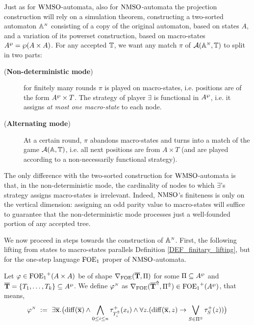 Just as for $\mathrm{WMSO}$-automata, also for $\mathrm{NMSO}$-automata the projection construction will rely on a simulation theorem, constructing a two-sorted automaton $\mathbb{A}^{{\scriptscriptstyle N}}$ consisting of a copy of the original automaton, based on states $A$, and a variation of its powerset construction, based on macro-states $A^{\wp} = \wp(A \times A)$. For any accepted $\mathbb{T}$, we want any match $\pi$ of $\mathcal{A}(\mathbb{A}^{{\scriptscriptstyle N}},\mathbb{T})$ to split in two parts:
\begin{description}
  \item[(\textbf{Non-deterministic mode})] for finitely many rounds $\pi$ is played on macro-states, i.e. positions are of the form $A^{\wp} \times T$. The strategy of player $\exists$ is functional in $A^{\wp}$, i.e. it assigns \emph{at most one macro-state} to each node.
  \item[(\textbf{Alternating mode})] At a certain round, $\pi$ abandons macro-states and turns into a match of the game $\mathcal{A}(\mathbb{A},\mathbb{T})$, i.e. all next positions are from $A \times T$ (and are played according to a non-necessarily functional strategy). %
\end{description}
The only difference with the two-sorted construction for $\mathrm{WMSO}$-automata is that, in the non-deterministic mode, the cardinality of nodes to which $\exists$'s strategy assigns macro-states is irrelevant. Indeed, $\mathrm{NMSO}$'s finiteness is only on the vertical dimension: assigning an odd parity value to macro-states will suffice to guarantee that the non-deterministic mode processes just a well-founded portion of any accepted tree.

We now proceed in steps towards the construction of $\mathbb{A}^{{\scriptscriptstyle N}}$. First, the following lifting from states to macro-states parallels Definition \ref{DEF_finitary_lifting}, but for the one-step language $\mathrm{FOE}_1$ proper of $\mathrm{NMSO}$-automata.

\begin{definition}\label{DEF_noetherian_lifting}
Let $\varphi \in {\ensuremath{\mathrm{FOE}_1}}^+(A \times A)$ be of shape $\nabla_{\mathrm{FOE}}(\overline{{\mathbf{T}}},\Pi)$ for some $\Pi \subseteq A^{\wp}$ and $\overline{{\mathbf{T}}} = \{T_1,\dots,T_k\} \subseteq A^{\wp}$. We define $\varphi^{{\scriptscriptstyle N}}$ as $\nabla_{\mathrm{FOE}}(\overline{{\mathbf{T}}}^{\Uparrow},\Pi^{\Uparrow}) \in {\ensuremath{\mathrm{FOE}_1}}^+(A^{\wp} )$, that means,
\begin{equation}\label{eq:unfoldingNablaofoe}
\varphi^{\noet} \ \df \ 
    \exists \vlist{x}.\big(\arediff{\vlist{x}} \land \bigwedge_{0 \leq i \leq n} \tau^+_{\lift{T}_i}(x_i)
\land 
    \forall z.(\arediff{\vlist{x},z} \lthen \bigvee_{S\in \lift{\Pi} } \tau^+_S(z))\big)
\end{equation}
\end{definition}

